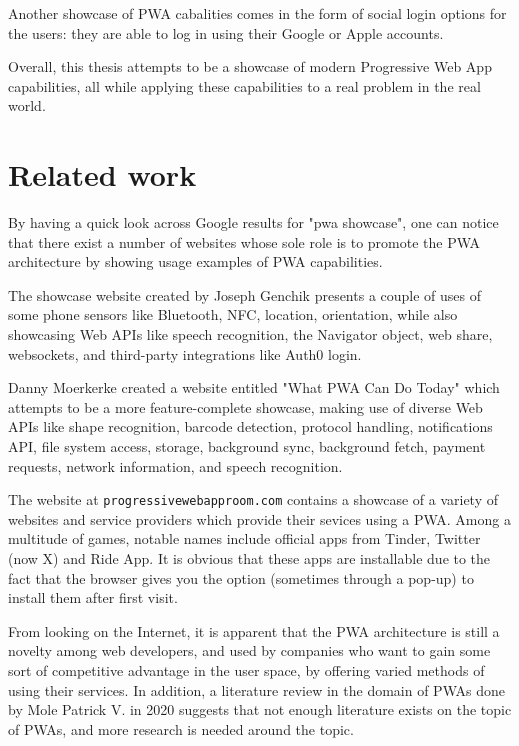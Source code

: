 Another showcase of PWA cabalities comes in the form of social login options for the users: they are able to log in using their Google or Apple accounts.

Overall, this thesis attempts to be a showcase of modern Progressive Web App capabilities, all while applying these capabilities to a real problem in the real world.

\section{Related work}

By having a quick look across Google results for "pwa showcase", one can notice that there exist a number of websites whose sole role is to promote the PWA architecture by showing usage examples of PWA capabilities.

The showcase website created by Joseph Genchik \cite{GenchikPWAShowcase} presents a couple of uses of some phone sensors like Bluetooth, NFC, location, orientation, while also showcasing Web APIs like speech recognition, the Navigator object, web share, websockets, and third-party integrations like Auth0 login.

Danny Moerkerke created a website entitled "What PWA Can Do Today" \cite{MoerkerkePWAShowcase} which attempts to be a more feature-complete showcase, making use of diverse Web APIs like shape recognition, barcode detection, protocol handling, notifications API, file system access, storage, background sync, background fetch, payment requests, network information, and speech recognition.

The website at \verb|progressivewebapproom.com| \cite{PWARoom} contains a showcase of a variety of websites and service providers which provide their sevices using a PWA. Among a multitude of games, notable names include official apps from Tinder, Twitter (now X) and Ride App. It is obvious that these apps are installable due to the fact that the browser gives you the option (sometimes through a pop-up) to install them after first visit.

From looking on the Internet, it is apparent that the PWA architecture is still a novelty among web developers, and used by companies who want to gain some sort of competitive advantage in the user space, by offering varied methods of using their services. In addition, a literature review in the domain of PWAs done by Mole Patrick V. in 2020 \cite{MoleLitRev} suggests that not enough literature exists on the topic of PWAs, and more research is needed around the topic.
